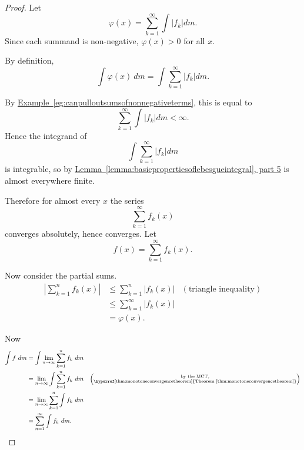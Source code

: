 \documentclass[a4paper,12pt]{scrreprt}
\theoremstyle{definition}
\theoremstyle{plain}
\theoremstyle{remark}
\begin{document}
\begin{proof}
  Let
  \begin{equation*}
    \varphi(x) = \sum_{k=1}^{\infty} \int \left|f_{k}\right| dm.
  \end{equation*}
  Since each summand is non-negative, $\varphi(x) > 0$ for all $x$.

  By definition,
  \begin{equation*}
    \int \varphi(x)\ dm = \int\sum_{k=1}^{\infty}\left|f_{k}\right|dm.
  \end{equation*}

  By \hyperref[eg:canpulloutsumsofnonnegativeterms]{Example~\ref*{eg:canpulloutsumsofnonnegativeterms}}, this is equal to
  \begin{equation*}
    \sum_{k=1}^{\infty}\int\left|f_{k}\right|dm < \infty.
  \end{equation*}
  Hence the integrand of
  \begin{equation*}
    \int\sum_{k=1}^{\infty}\left|f_{k}\right|dm
  \end{equation*}
  is integrable, so by \hyperref[lemma:basicpropertiesoflebesgueintegral]{Lemma~\ref*{lemma:basicpropertiesoflebesgueintegral}, part 5} is almost everywhere finite.

  Therefore for almost every $x$ the series
  \begin{equation*}
    \sum_{k=1}^{\infty} f_{k}(x)
  \end{equation*}
  converges absolutely, hence converges. Let
  \begin{equation*}
    f(x) = \sum_{k=1}^{\infty} f_{k}(x).
  \end{equation*}

  Now consider the partial sums.
  \begin{align*}
    \left|\sum_{k=1}^{n} f_{k}(x) \right| &\leq \sum_{k=1}^{n} \left|f_{k}(x) \right| & (\text{triangle inequality}) \\
    &\leq \sum_{k=1}^{\infty} \left| f_{k}(x) \right| \\
    &= \varphi(x).
  \end{align*}

  Now
  \begin{align*}
    \int f\ dm &= \int \lim_{n \to \infty} \sum_{k=1}^{n} f_{k}\ dm \\
    &= \lim_{n \to \infty} \int \sum_{k=1}^{n} f_{k}\ dm &\left( \substack{\text{by the MCT,}\\ \text{\hyperref[thm:monotoneconvergencetheorem]{Theorem~\ref*{thm:monotoneconvergencetheorem}}}} \right) \\
    &= \lim_{n \to \infty} \sum_{k = 1}^{n} \int f_{k}\ dm \\
    &= \sum_{n=1}^{\infty} \int f_{k}\ dm.
  \end{align*}
\end{proof}
\end{document}
